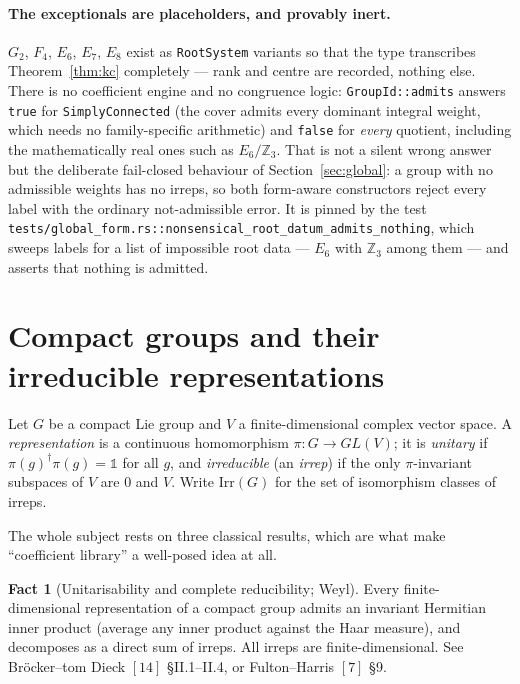 \documentclass[11pt,a4paper]{article}
\theoremstyle{plain}
\theoremstyle{definition}
\newtheorem{fact}[theorem]{Fact}
\newcommand{\Irr}{\mathrm{Irr}}
\newcommand{\id}{\mathbb{1}}
\newcommand{\ZZ}{\mathbb{Z}}
\newcommand{\code}[1]{\texttt{#1}}
\begin{document}
\paragraph{The exceptionals are placeholders, and provably inert.}
$G_2$, $F_4$, $E_6$, $E_7$, $E_8$ exist as \code{RootSystem} variants so that
the type transcribes Theorem~\ref{thm:kc} completely --- rank and centre are
recorded, nothing else. There is no coefficient engine and no congruence
logic: \code{GroupId::admits} answers \code{true} for
\code{SimplyConnected} (the cover admits every dominant integral weight, which
needs no family-specific arithmetic) and \code{false} for \emph{every}
quotient, including the mathematically real ones such as $E_6/\ZZ_3$. That is
not a silent wrong answer but the deliberate fail-closed behaviour of
Section~\ref{sec:global}: a group with no admissible weights has no irreps, so
both form-aware constructors reject every label with the ordinary
not-admissible error. It is pinned by the test
\code{tests/global\_form.rs::nonsensical\_root\_datum\_admits\_nothing}, which
sweeps labels for a list of impossible root data --- $E_6$ with
$\ZZ_3$ among them --- and asserts that nothing is admitted.


\section{Compact groups and their irreducible representations}
\label{sec:compact}

Let $G$ be a compact Lie group and $V$ a finite-dimensional complex vector
space. A \emph{representation} is a continuous homomorphism
$\pi: G\to GL(V)$; it is \emph{unitary} if $\pi(g)^\dagger\pi(g)=\id$ for all
$g$, and \emph{irreducible} (an \emph{irrep}) if the only $\pi$-invariant
subspaces of $V$ are $0$ and $V$. Write $\Irr(G)$ for the set of isomorphism
classes of irreps.

The whole subject rests on three classical results, which are what make
``coefficient library'' a well-posed idea at all.

\begin{fact}[Unitarisability and complete reducibility; Weyl]
\label{fact:cr}
Every finite-dimensional representation of a compact group admits an invariant
Hermitian inner product (average any inner product against the Haar measure),
and decomposes as a direct sum of irreps. All irreps are
finite-dimensional. See Br\"ocker--tom Dieck $[14]$ \S II.1--II.4, or
Fulton--Harris $[7]$ \S9.
\end{fact}
\end{document}
